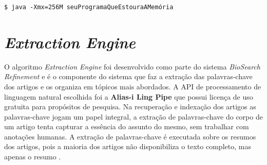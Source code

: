 \begin{lstlisting}
$ java -Xmx=256M seuProgramaQueEstouraAMemória
\end{lstlisting}

\section{\emph{Extraction Engine}}
O algoritmo \emph{Extraction Engine} foi desenvolvido como parte do sistema \emph{BioSearch Refinement} e é o componente do sistema que faz a extração das palavras-chave dos artigos e os organiza em tópicos mais abordados. A API de processamento de linguagem natural escolhida foi a \textbf{Alias-i Ling Pipe} que possui licença de uso gratuita para propósitos de pesquisa. Na recuperação e indexação dos artigos as palavras-chave jogam um papel integral, a extração de palavras-chave do corpo de um artigo tenta capturar a essência do assunto do mesmo, sem trabalhar com anotações humanas. A extração de palavras-chave é executada sobre os resumos dos artigos, pois a maioria dos artigos não disponibiliza o texto completo, mas apenas o resumo \cite{Hulth2003}.

